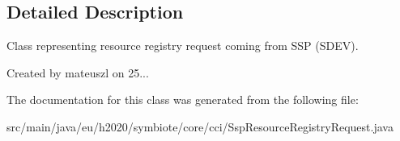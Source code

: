 \subsection{Detailed Description}
Class representing resource registry request coming from S\+SP (S\+D\+EV).

Created by mateuszl on 25... 

The documentation for this class was generated from the following file\+:\begin{DoxyCompactItemize}
\item 
src/main/java/eu/h2020/symbiote/core/cci/Ssp\+Resource\+Registry\+Request.\+java\end{DoxyCompactItemize}
